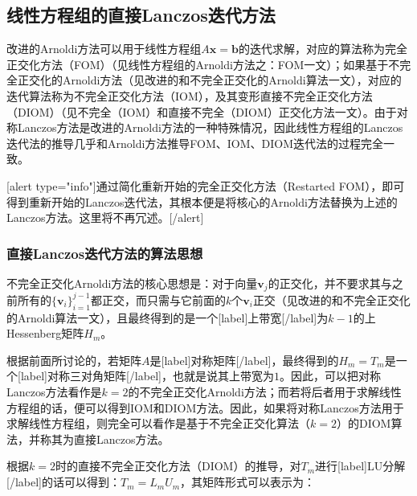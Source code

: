 \documentclass[UTF8,nofonts]{ctexart}
\begin{document}
\subsection*{线性方程组的直接Lanczos迭代方法}

改进的Arnoldi方法可以用于线性方程组$A\boldsymbol{x}=\boldsymbol{b}$的迭代求解，对应的算法称为完全正交化方法（FOM）（见线性方程组的Arnoldi方法之：FOM一文）；如果基于不完全正交化的Arnoldi方法（见改进的和不完全正交化的Arnoldi算法一文），对应的迭代算法称为不完全正交化方法（IOM），及其变形直接不完全正交化方法（DIOM）（见不完全（IOM）和直接不完全（DIOM）正交化方法一文）。由于对称Lanczos方法是改进的Arnoldi方法的一种特殊情况，因此线性方程组的Lanczos迭代法的推导几乎和Arnoldi方法推导FOM、IOM、DIOM迭代法的过程完全一致。

[alert type="info"]通过简化重新开始的完全正交化方法（Restarted FOM），即可得到重新开始的Lanczos迭代法，其根本便是将核心的Arnoldi方法替换为上述的Lanczos方法。这里将不再冗述。[/alert]

\subsubsection*{直接Lanczos迭代方法的算法思想}

不完全正交化Arnoldi方法的核心思想是：对于向量$\boldsymbol{v}_j$的正交化，并不要求其与之前所有的$\{\boldsymbol{v}_i\}_{i=1}^{j-1}$都正交，而只需与它前面的$k$个$\boldsymbol{v}_i$正交（见改进的和不完全正交化的Arnoldi算法一文），且最终得到的是一个[label]上带宽[/label]为$k-1$的上Hessenberg矩阵$H_m$。

根据前面所讨论的，若矩阵$A$是[label]对称矩阵[/label]，最终得到的$H_m=T_m$是一个[label]对称三对角矩阵[/label]，也就是说其上带宽为$1$。因此，可以把对称Lanczos方法看作是$k=2$的不完全正交化Arnoldi方法；而若将后者用于求解线性方程组的话，便可以得到IOM和DIOM方法。因此，如果将对称Lanczos方法用于求解线性方程组，则完全可以看作是基于不完全正交化算法（$k=2$）的DIOM算法，并称其为直接Lanczos方法。

根据$k=2$时的直接不完全正交化方法（DIOM）的推导，对$T_m$进行[label]LU分解[/label]的话可以得到：$T_m=L_mU_m$，其矩阵形式可以表示为：
\end{document}
